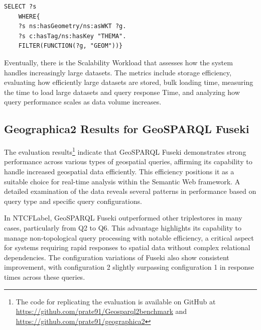 \begin{lstlisting}[caption=Template to build queries for synthetic workload from \cite{ioannidisEvaluatingGeospatialRDF2021}, label={lst:template-synthetic}]
 SELECT ?s
    WHERE{ 
    ?s ns:hasGeometry/ns:asWKT ?g.
    ?s c:hasTag/ns:hasKey "THEMA".
    FILTER(FUNCTION(?g, "GEOM"))}
\end{lstlisting}

Eventually, there is the Scalability Workload that assesses how the system handles increasingly large datasets. The metrics include storage efficiency, evaluating how efficiently large datasets are stored, bulk loading time, measuring the time to load large datasets and query response Time, and analyzing how query performance scales as data volume increases.

\subsection{Geographica2 Results for GeoSPARQL Fuseki}\label{VI-subsec:geographica2-results}

The evaluation results\footnote{The code for replicating the evaluation is available on GitHub at \url{https://github.com/prate91/Geosparql2benchmark} and \url{https://github.com/prate91/geographica2}} indicate that GeoSPARQL Fuseki demonstrates strong performance across various types of geospatial queries, affirming its capability to handle increased geospatial data efficiently. This efficiency positions it as a suitable choice for real-time analysis within the Semantic Web framework. A detailed examination of the data reveals several patterns in performance based on query type and specific query configurations.

In \acrshort{NTCFLabel}, GeoSPARQL Fuseki outperformed other triplestores in many cases, particularly from Q2 to Q6. This advantage highlights its capability to manage non-topological query processing with notable efficiency, a critical aspect for systems requiring rapid responses to spatial data without complex relational dependencies. The configuration variations of Fuseki also show consistent improvement, with configuration 2 slightly surpassing configuration 1 in response times across these queries.


